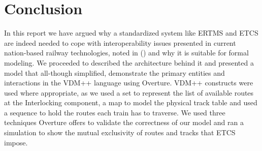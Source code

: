 \documentclass[preprint,12pt]{elsarticle}
\begin{document}
\section{Conclusion}

In this report we have argued why a standardized system like ERTMS and ETCS are indeed needed to cope with interoperability issues presented in current nation-based railway technologies, noted in (\citet{Commission2018}) and why it is suitable for formal modeling. We proceeded to described the architecture behind it and presented a model that all-though simplified, demonstrate the primary entities and interactions in the VDM++ language using Overture. VDM++ constructs were used where appropriate, as we used a set to represent the list of available routes at the Interlocking component, a map to model the physical track table and used a sequence to hold the routes each train has to traverse. We used three techniques Overture offers to validate the correctness of our model and ran a simulation to show the mutual exclusivity of routes and tracks that ETCS impose.



\end{document}
